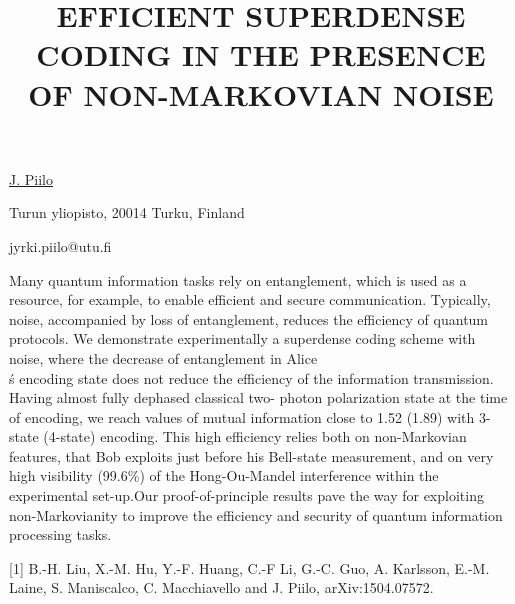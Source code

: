 \title{EFFICIENT SUPERDENSE CODING IN THE PRESENCE OF NON-MARKOVIAN NOISE}

\underline{J. Piilo} 

{\normalsize{\vspace{-4mm}
Turun yliopisto, 20014 Turku, Finland

\email jyrki.piilo@utu.fi}}

Many quantum information tasks rely on entanglement, which is used as a resource, for example, to enable efficient and
secure communication. Typically, noise, accompanied by loss of entanglement, reduces the efficiency of quantum protocols.
We demonstrate experimentally a superdense coding scheme with noise, where the decrease of entanglement in Alice\\\'s
encoding state does not reduce the efficiency of the information transmission. Having almost fully dephased classical two-
photon polarization state at the time of encoding, we reach values of mutual information close to 1.52 (1.89) with 3-state  (4-state) encoding. This high efficiency relies both on non-Markovian features, that Bob exploits just before his Bell-state
measurement, and on very high visibility (99.6\%) of the Hong-Ou-Mandel interference within the experimental set-up.Our
proof-of-principle results pave the way for exploiting non-Markovianity to improve the efficiency and security of quantum
information processing tasks.

{\normalsize
[1] B.-H. Liu, X.-M. Hu, Y.-F. Huang, C.-F Li, G.-C. Guo, A. Karlsson, E.-M. Laine, S. Maniscalco, C. Macchiavello and J. Piilo,
arXiv:1504.07572.
}

\vspace{\baselineskip}
